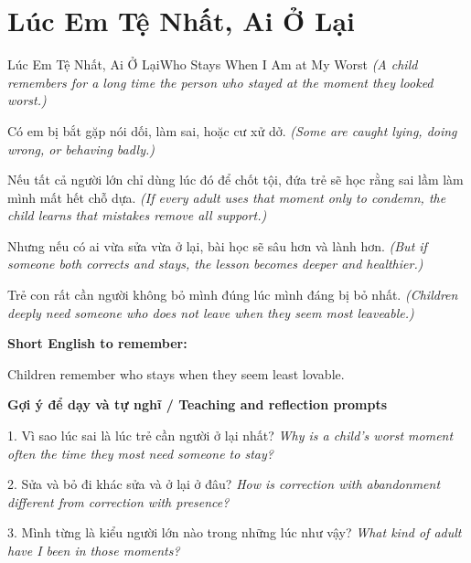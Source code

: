 \section{Lúc Em Tệ Nhất, Ai Ở Lại}
\begin{truyen}{Lúc Em Tệ Nhất, Ai Ở Lại}{Who Stays When I Am at My Worst}
\textit{(A child remembers for a long time the person who stayed at the moment they looked worst.)}

Có em bị bắt gặp nói dối, làm sai, hoặc cư xử dở.
\textit{(Some are caught lying, doing wrong, or behaving badly.)}

Nếu tất cả người lớn chỉ dùng lúc đó để chốt tội, đứa trẻ sẽ học rằng sai lầm làm mình mất hết chỗ dựa.
\textit{(If every adult uses that moment only to condemn, the child learns that mistakes remove all support.)}

Nhưng nếu có ai vừa sửa vừa ở lại, bài học sẽ sâu hơn và lành hơn.
\textit{(But if someone both corrects and stays, the lesson becomes deeper and healthier.)}

\end{truyen}

\begin{baihoc}
Trẻ con rất cần người không bỏ mình đúng lúc mình đáng bị bỏ nhất.
\textit{(Children deeply need someone who does not leave when they seem most leaveable.)}
\end{baihoc}

\begin{ghinhoanh}
\textbf{Short English to remember:}

Children remember who stays when they seem least lovable.

\end{ghinhoanh}

\begin{tuhocnhanh}
\textbf{Gợi ý để dạy và tự nghĩ / Teaching and reflection prompts}

1. Vì sao lúc sai là lúc trẻ cần người ở lại nhất? \textit{Why is a child's worst moment often the time they most need someone to stay?}

2. Sửa và bỏ đi khác sửa và ở lại ở đâu? \textit{How is correction with abandonment different from correction with presence?}

3. Mình từng là kiểu người lớn nào trong những lúc như vậy? \textit{What kind of adult have I been in those moments?}
\end{tuhocnhanh}
\ngancach

